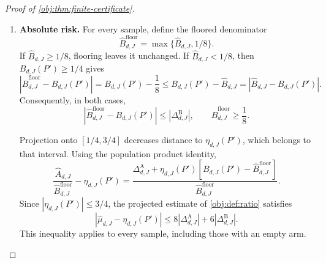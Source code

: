 \documentclass[11pt]{article}
\begin{document}
\begin{proof}[Proof of \cref{obj:thm:finite-certificate}]
\begin{enumerate}
For \(x\in[0,1]\), reflection preserves the distance from zero. Thus
\cref{obj:ass:mean-holder} gives
\[
|\mu_d(P',s_dx)-\mu_d(P',0)|\le2x^\beta.
\]
Subtracting the cutoff mean inside the weighted integral yields
\[
\eta_{d,J}(P')-\mu_d(P',0)
=
\frac{
\int_0^1K_J(x)f(P',s_dx)
[\mu_d(P',s_dx)-\mu_d(P',0)]\,dx
}{B_{d,J}(P')}.
\]
The numerator satisfies
\[
\begin{aligned}
\left|
\int_0^1K_J(x)f(P',s_dx)
[\mu_d(P',s_dx)-\mu_d(P',0)]\,dx
\right|
&\le\int_0^1K_J(x)f(P',s_dx)\,2x^\beta\,dx\\
&\le\frac32M_{J,\beta}.
\end{aligned}
\]
Since \(M_{J,\beta}\ge0\) and \(B_{d,J}(P')\ge1/4\), it follows that
\[
|\eta_{d,J}(P')-\mu_d(P',0)|\le6M_{J,\beta}.
\]
Together with the expectation identity above, this also proves the required lower bound on each unmarked population expectation.

\item \textbf{Absolute risk.}
For every sample, define the floored denominator
\[
\widehat B^{\mathrm{floor}}_{d,J}
=\max\{\widehat B_{d,J},1/8\}.
\]
If \(\widehat B_{d,J}\ge1/8\), flooring leaves it unchanged. If
\(\widehat B_{d,J}<1/8\), then \(B_{d,J}(P')\ge1/4\) gives
\[
\left|\widehat B^{\mathrm{floor}}_{d,J}-B_{d,J}(P')\right|
=B_{d,J}(P')-\frac18
\le B_{d,J}(P')-\widehat B_{d,J}
=\left|\widehat B_{d,J}-B_{d,J}(P')\right|.
\]
Consequently, in both cases,
\[
\left|\widehat B^{\mathrm{floor}}_{d,J}-B_{d,J}(P')\right|
\le|\Delta^{\mathrm B}_{d,J}|,
\qquad
\widehat B^{\mathrm{floor}}_{d,J}\ge\frac18.
\]

Projection onto \([1/4,3/4]\) decreases distance to
\(\eta_{d,J}(P')\), which belongs to that interval. Using the population product identity,
\[
\frac{\widehat A_{d,J}}{\widehat B^{\mathrm{floor}}_{d,J}}
-\eta_{d,J}(P')
=
\frac{
\Delta^{\mathrm A}_{d,J}
+\eta_{d,J}(P')
[B_{d,J}(P')-\widehat B^{\mathrm{floor}}_{d,J}]
}{\widehat B^{\mathrm{floor}}_{d,J}}.
\]
Since \(|\eta_{d,J}(P')|\le3/4\), the projected estimate of
\cref{obj:def:ratio} satisfies
\[
|\widehat\mu_{d,J}-\eta_{d,J}(P')|
\le8|\Delta^{\mathrm A}_{d,J}|
+6|\Delta^{\mathrm B}_{d,J}|.
\]
This inequality applies to every sample, including those with an empty arm.


\end{enumerate}
\end{proof}
\end{document}
